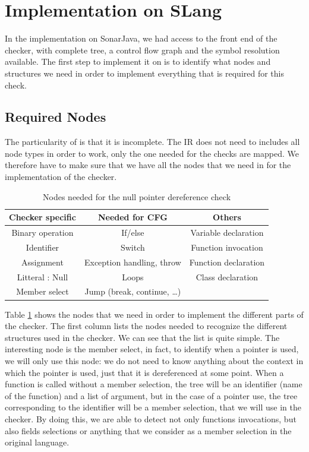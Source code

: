 \section{Implementation on SLang}
\label{sec:implementation_slang}

In the implementation on SonarJava, we had access to the front end of the checker, with complete tree, a control flow graph and the symbol resolution available.
The first step to implement it on \slang{} is to identify what nodes and structures we need in order to implement everything that is required for this check.

\subsection{Required Nodes}
\label{subsec:nodes}

The particularity of \slang{}  is that it is incomplete. 
The IR does not need to includes all node types in order to work, only the one needed for the checks are mapped. 
We therefore have to make sure that we have all the nodes that we need in \slang{} for the implementation of the checker.

\begin{table}[h]
	\caption{Nodes needed for the null pointer dereference check}
	\label{table:nodes-needed}
	\begin{tabular}{|c|c|c|}
		\hline
		\bf Checker specific & \bf Needed for CFG & \bf Others  \\ \hline
	    Binary operation & If/else & Variable declaration \\
		Identifier & Switch & Function invocation \\
		Assignment & Exception handling, throw  & Function declaration \\
		Litteral : Null & Loops & Class declaration \\
		Member select & Jump (break, continue, …) & \\ \hline
	\end{tabular}
\end{table}

Table \ref{table:nodes-needed} shows the nodes that we need in order to implement the different parts of the checker.
The first column lists the nodes needed to recognize the different structures used in the checker. 
We can see that the list is quite simple. 
The interesting node is the member select, in fact, to identify when a pointer is used, we will only use this node: we do not need to know anything about the context in which the pointer is used, just that it is dereferenced at some point.
When a function is called without a member selection, the tree will be an identifier (name of the function) and a list of argument, but in the case of a pointer use, the tree corresponding to the identifier will be a member selection, that we will use in the checker.
By doing this, we are able to detect not only functions invocations, but also fields selections or anything that we consider as a member selection in the original language.

